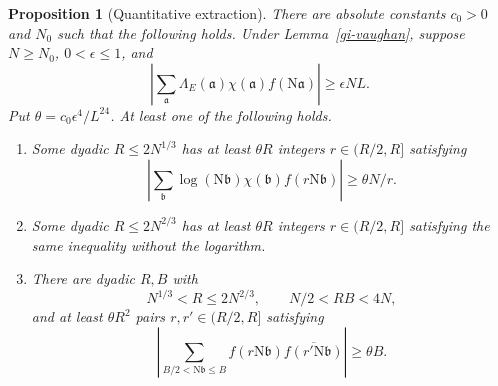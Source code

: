 \documentclass[11pt]{article}
\newtheorem{proposition}[theorem]{Proposition}
\theoremstyle{definition}
\theoremstyle{remark}
\begin{document}
\begin{proposition}[Quantitative extraction]\label{gi-extraction}
There are absolute constants $c_0>0$ and $N_0$ such that the following
holds.  Under Lemma~\ref{gi-vaughan}, suppose $N\geq N_0$,
$0<\epsilon\leq1$, and
\begin{equation}\label{gi-large-correlation}
 \left|\sum_{\mathfrak a}\Lambda_E(\mathfrak a)\chi(\mathfrak a)
                         f(\mathrm N\mathfrak a)\right|\geq\epsilon NL.
\end{equation}
Put $\theta=c_0\epsilon^4/L^{24}$.  At least one of the following holds.
\begin{enumerate}
\item Some dyadic $R\leq2N^{1/3}$ has at least $\theta R$ integers
$r\in(R/2,R]$ satisfying
\[
 \left|\sum_{\mathfrak b}\log(\mathrm N\mathfrak b)\chi(\mathfrak b)
                   f(r\mathrm N\mathfrak b)\right|\geq\theta N/r.
\]
\item Some dyadic $R\leq2N^{2/3}$ has at least $\theta R$ integers
$r\in(R/2,R]$ satisfying the same inequality without the logarithm.
\item There are dyadic $R,B$ with
\begin{equation}\label{gi-dyadic-ranges}
 N^{1/3}<R\leq2N^{2/3},\qquad N/2<RB<4N,
\end{equation}
and at least $\theta R^2$ pairs $r,r'\in(R/2,R]$ satisfying
\begin{equation}\label{gi-type-two-correlation}
 \left|\sum_{B/2<\mathrm N\mathfrak b\leq B}
       f(r\mathrm N\mathfrak b)\overline{f(r'\mathrm N\mathfrak b)}
       \right|\geq\theta B.
\end{equation}
\end{enumerate}
\end{proposition}
\end{document}
